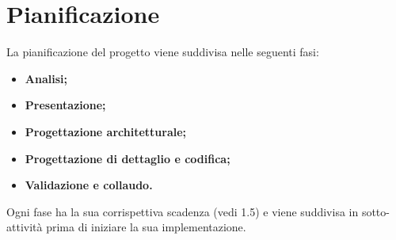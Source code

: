 \section{Pianificazione}
La pianificazione del progetto viene suddivisa nelle seguenti fasi:
\begin{itemize}
	\item \textbf{Analisi;}
	\item \textbf{Presentazione;}
	\item \textbf{Progettazione architetturale;}
	\item \textbf{Progettazione di dettaglio e codifica;}
	\item \textbf{Validazione e collaudo.}
\end{itemize}
Ogni fase ha la sua corrispettiva scadenza (vedi 1.5) e viene suddivisa in sotto-attività prima di iniziare la sua implementazione.
